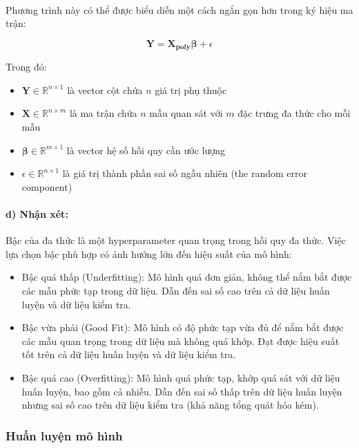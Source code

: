 \paragraph{}{Phương trình này có thể được biểu diễn một cách ngắn gọn hơn trong ký hiệu ma trận:}

\begin{equation}
    \mathbf{Y} = \mathbf{X_{poly}}\boldsymbol{\beta} + \epsilon
\end{equation}

Trong đó:
\begin{itemize}
    \item $\mathbf{Y} \in \mathbb{R}^{n \times 1}$ là vector cột chứa $n$ giá trị phụ thuộc
    \item $\mathbf{X} \in \mathbb{R}^{n \times m}$ là ma trận chứa $n$ mẫu quan sát với $m$ đặc trưng đa thức cho mỗi mẫu
    \item $\boldsymbol{\beta} \in \mathbb{R}^{m \times 1}$ là vector hệ số hồi quy cần ước lượng
    \item $\epsilon \in \mathbb{R}^{n \times 1}$ là giá trị thành phần sai số ngẫu nhiên (the random error component)
\end{itemize}

\paragraph{d) Nhận xét:}{Bậc của đa thức là một hyperparameter quan trọng trong hồi quy đa thức. Việc lựa chọn bậc phù hợp có ảnh hưởng lớn đến hiệu suất của mô hình:}
\begin{itemize}
    \item Bậc quá thấp (Underfitting): Mô hình quá đơn giản, không thể nắm bắt được các mẫu phức tạp trong dữ liệu. Dẫn đến sai số cao trên cả dữ liệu huấn luyện và dữ liệu kiểm tra.

    \item Bậc vừa phải (Good Fit): Mô hình có độ phức tạp vừa đủ để nắm bắt được các mẫu quan trọng trong dữ liệu mà không quá khớp. Đạt được hiệu suất tốt trên cả dữ liệu huấn luyện và dữ liệu kiểm tra.

    \item Bậc quá cao (Overfitting): Mô hình quá phức tạp, khớp quá sát với dữ liệu huấn luyện, bao gồm cả nhiễu. Dẫn đến sai số thấp trên dữ liệu huấn luyện nhưng sai số cao trên dữ liệu kiểm tra (khả năng tổng quát hóa kém).
\end{itemize}

\subsubsection{Huấn luyện mô hình}
